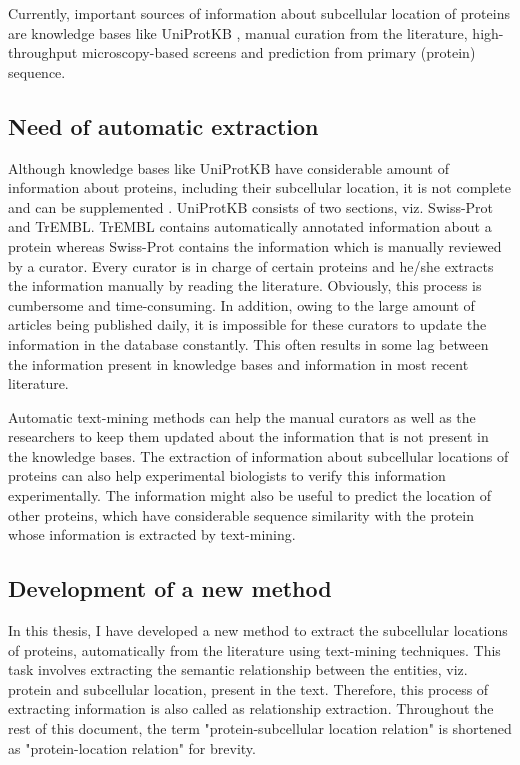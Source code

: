 Currently, important sources of information about subcellular location of proteins are knowledge bases like UniProtKB \cite{magrane2011uniprot}, manual curation from the literature, high-throughput microscopy-based screens and prediction from primary (protein) sequence.

\subsection{Need of automatic extraction}

Although knowledge bases like UniProtKB \cite{magrane2011uniprot} have considerable amount of information about proteins, including their subcellular location, it is not complete and can be supplemented \cite{goldberg2015linked}. UniProtKB consists of two sections, viz. Swiss-Prot and TrEMBL. TrEMBL contains automatically annotated information about a protein whereas Swiss-Prot contains the information which is manually reviewed by a curator. Every curator is in charge of certain proteins and he/she extracts the information manually by reading the literature. Obviously, this process is cumbersome and time-consuming. In addition, owing to the large amount of articles being published daily, it is impossible for these curators to update the information in the database constantly. This often results in some lag between the information present in knowledge bases and information in most recent literature.

Automatic text-mining methods can help the manual curators as well as the researchers to keep them updated about the information that is not present in the knowledge bases. The extraction of information about subcellular locations of proteins can also help experimental biologists to verify this information experimentally. The information might also be useful to predict the location of other proteins, which have considerable sequence similarity with the protein whose information is extracted by text-mining.

\subsection{Development of a new method}

In this thesis, I have developed a new method to extract the subcellular locations of proteins, automatically from the literature using text-mining techniques. This task involves extracting the semantic relationship between the entities, viz. protein and subcellular location, present in the text. Therefore, this process of extracting information is also called as relationship extraction. Throughout the rest of this document, the term "protein-subcellular location relation" is shortened  as "protein-location relation" for brevity.

